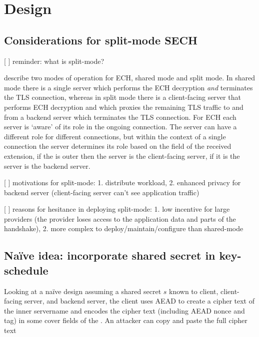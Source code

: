 
\chapter{Design}
\label{chap:Design}

\section{Considerations for split-mode SECH}
[ ] reminder: what is split-mode?

\cite{esni} describe two modes of operation for ECH, shared mode and split mode. In shared mode there is a single server which performs the ECH decryption {\em and} terminates the TLS connection, whereas in split mode there is a client-facing server that performs ECH decryption and which proxies the remaining TLS traffic to and from a backend server which terminates the TLS connection. For ECH each server is `aware' of its role in the ongoing connection. The server can have a different role for different connections, but within the context of a single connection the server determines its role based on the  field of the received  extension, if the  is outer then the server is the client-facing server, if it is  the server is the backend server.

[ ] motivations for split-mode: 1. distribute workload, 2. enhanced privacy for backend server (client-facing server can't see application traffic)

[ ] reasons for hesitance in deploying split-mode: 1. low incentive for large providers (the provider loses access to the application data and parts of the handshake), 2. more complex to deploy/maintain/configure than shared-mode

\section{Naïve idea: incorporate shared secret in key-schedule}
Looking at a naïve design assuming a shared secret $s$ known to client, client-facing server, and backend server, the client uses AEAD to create a cipher text of the inner servername and encodes the cipher text (including AEAD nonce and tag) in some cover fields of the . An attacker can copy and paste the full cipher text


